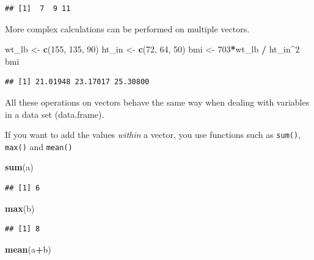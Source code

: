 \documentclass[
]{article}
\newenvironment{Shaded}{\begin{snugshade}}{\end{snugshade}}
\newcommand{\DecValTok}[1]{\textcolor[rgb]{0.00,0.00,0.81}{#1}}
\newcommand{\KeywordTok}[1]{\textcolor[rgb]{0.13,0.29,0.53}{\textbf{#1}}}
\newcommand{\NormalTok}[1]{#1}
\newcommand{\OperatorTok}[1]{\textcolor[rgb]{0.81,0.36,0.00}{\textbf{#1}}}
\newcommand{\StringTok}[1]{\textcolor[rgb]{0.31,0.60,0.02}{#1}}
\begin{document}
\begin{verbatim}
## [1]  7  9 11
\end{verbatim}

More complex calculations can be performed on multiple vectors.

\begin{Shaded}
\begin{Highlighting}[]
\NormalTok{wt_lb <-}\StringTok{ }\KeywordTok{c}\NormalTok{(}\DecValTok{155}\NormalTok{, }\DecValTok{135}\NormalTok{, }\DecValTok{90}\NormalTok{)}
\NormalTok{ht_in <-}\StringTok{ }\KeywordTok{c}\NormalTok{(}\DecValTok{72}\NormalTok{, }\DecValTok{64}\NormalTok{, }\DecValTok{50}\NormalTok{)}
\NormalTok{bmi <-}\StringTok{ }\DecValTok{703}\OperatorTok{*}\NormalTok{wt_lb }\OperatorTok{/}\StringTok{ }\NormalTok{ht_in}\OperatorTok{^}\DecValTok{2}
\NormalTok{bmi}
\end{Highlighting}
\end{Shaded}

\begin{verbatim}
## [1] 21.01948 23.17017 25.30800
\end{verbatim}

All these operations on vectors behave the same way when dealing with
variables in a data set (data.frame).

If you want to add the values \emph{within} a vector, you use functions
such as \texttt{sum()}, \texttt{max()} and \texttt{mean()}

\begin{Shaded}
\begin{Highlighting}[]
\KeywordTok{sum}\NormalTok{(a)}
\end{Highlighting}
\end{Shaded}

\begin{verbatim}
## [1] 6
\end{verbatim}

\begin{Shaded}
\begin{Highlighting}[]
\KeywordTok{max}\NormalTok{(b)}
\end{Highlighting}
\end{Shaded}

\begin{verbatim}
## [1] 8
\end{verbatim}

\begin{Shaded}
\begin{Highlighting}[]
\KeywordTok{mean}\NormalTok{(a}\OperatorTok{+}\NormalTok{b)}
\end{Highlighting}
\end{Shaded}
\end{document}
